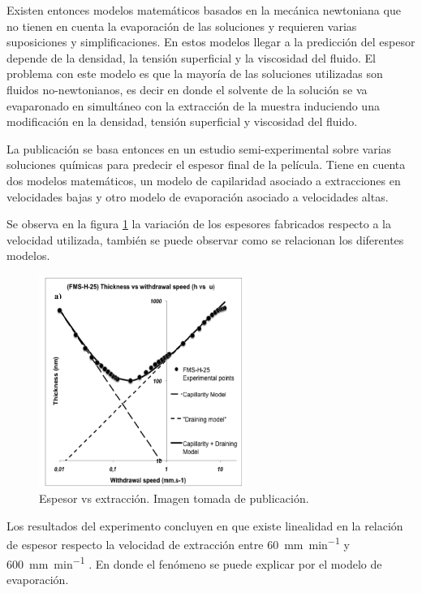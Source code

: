 Existen entonces modelos matemáticos basados en la mecánica newtoniana que no tienen en cuenta la evaporación de las soluciones y requieren varias suposiciones y simplificaciones. En estos modelos llegar a la predicción del espesor depende de la densidad, la tensión superficial y la viscosidad del fluido. El problema con este modelo es que la mayoría de las soluciones utilizadas son fluidos no-newtonianos, es decir en donde el solvente de la solución se va evaparonado en simultáneo con la extracción de la muestra induciendo una modificación en la densidad, tensión superficial y viscosidad del fluido. 


La publicación se basa entonces en  un estudio semi-experimental sobre varias soluciones químicas para predecir el espesor final de la película. Tiene en cuenta dos modelos matemáticos, un modelo de capilaridad asociado a extracciones en velocidades bajas y otro modelo de evaporación asociado a velocidades altas. 

Se observa en la figura \ref{fig:paper_galo} la variación de los espesores fabricados respecto a la velocidad utilizada, también se puede observar como se relacionan los diferentes modelos. 

\begin{figure}[htpb]
\centering 
\includegraphics[width=0.6\textwidth]{./Figures/paper_galo.png}
\caption{Espesor vs extracción. Imagen tomada de publicación.}
\label{fig:paper_galo}
\end{figure}

Los resultados del experimento concluyen en que existe linealidad  en la relación de espesor respecto la velocidad de extracción entre \SI{60}{\milli\meter\per\minute} y \SI{600}{\milli\meter\per\minute} . En donde el fenómeno se puede explicar por el modelo de evaporación.

